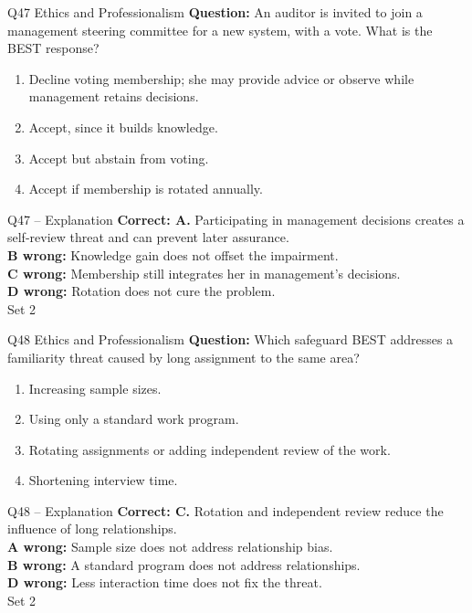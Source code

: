 \documentclass[aspectratio=169,10pt]{beamer}
\begin{document}
\begin{frame}[t]{Q47 \hfill {\scriptsize Ethics and Professionalism}}
	\small
	\textbf{Question:} An auditor is invited to join a management steering committee for a new system, with a vote. What is the BEST response?
	\begin{enumerate}[label=\Alph*.,itemsep=1pt,topsep=3pt]
			\item Decline voting membership; she may provide advice or observe while management retains decisions.
			\item Accept, since it builds knowledge.
			\item Accept but abstain from voting.
			\item Accept if membership is rotated annually.
	\end{enumerate}
\end{frame}

\begin{frame}[t]{Q47 -- Explanation}
	\footnotesize
	\textbf{Correct: A.} Participating in management decisions creates a self-review threat and can prevent later assurance. \\[5pt]
\textbf{B wrong:} Knowledge gain does not offset the impairment. \\[3pt]
\textbf{C wrong:} Membership still integrates her in management's decisions. \\[3pt]
\textbf{D wrong:} Rotation does not cure the problem. \\[3pt]
	\vfill {\tiny Set 2}
\end{frame}

\begin{frame}[t]{Q48 \hfill {\scriptsize Ethics and Professionalism}}
	\small
	\textbf{Question:} Which safeguard BEST addresses a familiarity threat caused by long assignment to the same area?
	\begin{enumerate}[label=\Alph*.,itemsep=1pt,topsep=3pt]
			\item Increasing sample sizes.
			\item Using only a standard work program.
			\item Rotating assignments or adding independent review of the work.
			\item Shortening interview time.
	\end{enumerate}
\end{frame}

\begin{frame}[t]{Q48 -- Explanation}
	\footnotesize
	\textbf{Correct: C.} Rotation and independent review reduce the influence of long relationships. \\[5pt]
\textbf{A wrong:} Sample size does not address relationship bias. \\[3pt]
\textbf{B wrong:} A standard program does not address relationships. \\[3pt]
\textbf{D wrong:} Less interaction time does not fix the threat. \\[3pt]
	\vfill {\tiny Set 2}
\end{frame}
\end{document}
